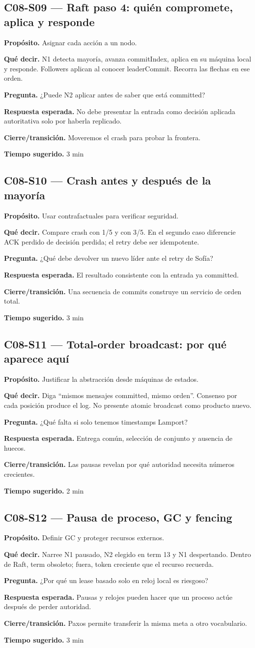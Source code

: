 \documentclass[variant=docente,cover=institutional,mode=screen]{ua-engineering-v6-article}
\newcommand{\FrameField}[2]{\par\noindent\textbf{#1.} #2\par}
\begin{document}
\subsection*{C08-S09 --- Raft paso 4: quién compromete, aplica y responde}
\FrameField{Propósito}{Asignar cada acción a un nodo.}
\FrameField{Qué decir}{N1 detecta mayoría, avanza commitIndex, aplica en su máquina local y responde. Followers aplican al conocer leaderCommit. Recorra las flechas en ese orden.}
\FrameField{Pregunta}{¿Puede N2 aplicar antes de saber que está committed?}
\FrameField{Respuesta esperada}{No debe presentar la entrada como decisión aplicada autoritativa solo por haberla replicado.}
\FrameField{Cierre/transición}{Moveremos el crash para probar la frontera.}
\FrameField{Tiempo sugerido}{3 min}

\subsection*{C08-S10 --- Crash antes y después de la mayoría}
\FrameField{Propósito}{Usar contrafactuales para verificar seguridad.}
\FrameField{Qué decir}{Compare crash con 1/5 y con 3/5. En el segundo caso diferencie ACK perdido de decisión perdida; el retry debe ser idempotente.}
\FrameField{Pregunta}{¿Qué debe devolver un nuevo líder ante el retry de Sofía?}
\FrameField{Respuesta esperada}{El resultado consistente con la entrada ya committed.}
\FrameField{Cierre/transición}{Una secuencia de commits construye un servicio de orden total.}
\FrameField{Tiempo sugerido}{3 min}

\subsection*{C08-S11 --- Total-order broadcast: por qué aparece aquí}
\FrameField{Propósito}{Justificar la abstracción desde máquinas de estados.}
\FrameField{Qué decir}{Diga “mismos mensajes committed, mismo orden”. Consenso por cada posición produce el log. No presente atomic broadcast como producto nuevo.}
\FrameField{Pregunta}{¿Qué falta si solo tenemos timestamps Lamport?}
\FrameField{Respuesta esperada}{Entrega común, selección de conjunto y ausencia de huecos.}
\FrameField{Cierre/transición}{Las pausas revelan por qué autoridad necesita números crecientes.}
\FrameField{Tiempo sugerido}{2 min}

\subsection*{C08-S12 --- Pausa de proceso, GC y fencing}
\FrameField{Propósito}{Definir GC y proteger recursos externos.}
\FrameField{Qué decir}{Narree N1 pausado, N2 elegido en term 13 y N1 despertando. Dentro de Raft, term obsoleto; fuera, token creciente que el recurso recuerda.}
\FrameField{Pregunta}{¿Por qué un lease basado solo en reloj local es riesgoso?}
\FrameField{Respuesta esperada}{Pausas y relojes pueden hacer que un proceso actúe después de perder autoridad.}
\FrameField{Cierre/transición}{Paxos permite transferir la misma meta a otro vocabulario.}
\FrameField{Tiempo sugerido}{3 min}
\end{document}
